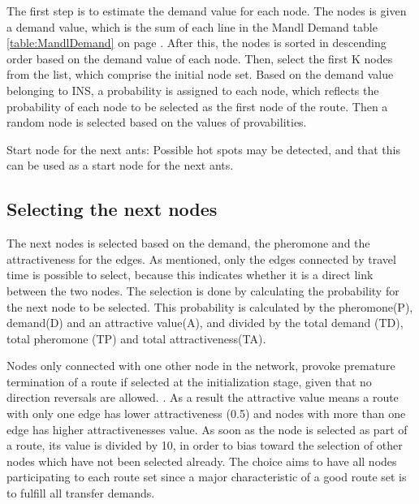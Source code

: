 The first step is to estimate the demand value for each node. The nodes is given a demand value, which is the sum of each line in the Mandl Demand table \ref{table:MandlDemand} on page \pageref{table:MandlDemand}.
After this, the nodes is sorted in descending order based on the demand value of each node.
Then, select the first K nodes from the list, which comprise the initial node set. Based on the demand value belonging to INS, a probability is assigned to each node, which reflects the probability of each node to be selected as the first node of the route. Then a random node is selected based on the values of provabilities. 

Start node for the next ants: Possible hot spots may be detected, and that this can be used as a start node for the next ants. 

\subsection{Selecting the next nodes}

\begin{algorithm}[H]
\end{algorithm}

The next nodes is selected based on the demand, the pheromone and the attractiveness for the edges. As mentioned, only the edges connected by travel time is possible to select, because this indicates whether it is a direct link between the two nodes. The selection is done by calculating the probability for the next node to be selected. This probability is calculated by the pheromone(P), demand(D) and an attractive value(A), and divided by the total demand (TD), total pheromone (TP) and total attractiveness(TA).

Nodes only connected with one other node in the network, provoke premature termination of a route if selected at the initialization stage, given that no direction reversals are allowed. \citep{kechagiopoulos14}. As a result the attractive value means a route with only one edge has lower attractiveness (0.5) and nodes with more than one edge has higher attractivenesses value. As soon as the node is selected as part of a route, its value is divided by 10, in order to bias toward the selection of other nodes which have not been selected already. The choice aims to have all nodes participating to each route set since a major characteristic of a good route set is to fulfill all transfer demands. %

